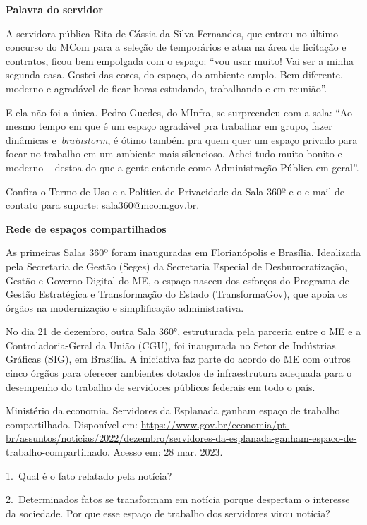 \begin{itemize}
\textbf{Palavra do servidor}

A servidora pública Rita de Cássia da Silva Fernandes, que entrou no
último concurso do MCom para a seleção de temporários e atua na área de
licitação e contratos, ficou bem empolgada com o espaço: ``vou usar
muito! Vai ser a minha segunda casa. Gostei das cores, do espaço, do
ambiente amplo. Bem diferente, moderno e agradável de ficar horas
estudando, trabalhando e em reunião''.

E ela não foi a única. Pedro Guedes, do MInfra, se surpreendeu com a
sala: ``Ao mesmo tempo em que é um espaço agradável pra trabalhar em
grupo, fazer dinâmicas e~\emph{brainstorm}, é ótimo também pra quem quer
um espaço privado para focar no trabalho em um ambiente mais silencioso.
Achei tudo muito bonito e moderno -- destoa do que a gente entende como
Administração Pública em geral''.

Confira o Termo de Uso e a Política de Privacidade da Sala 360º e o e-mail de contato
para
suporte: sala360@mcom.gov.br.

\textbf{Rede de espaços compartilhados}

As primeiras Salas 360º foram inauguradas em Florianópolis e Brasília.
Idealizada pela Secretaria de Gestão (Seges) da Secretaria Especial de
Desburocratização, Gestão e Governo Digital do ME, o espaço nasceu dos
esforços do Programa de Gestão Estratégica e Transformação do Estado
(TransformaGov), que apoia os órgãos na modernização e simplificação
administrativa.

No dia 21 de dezembro, outra Sala 360°, estruturada pela parceria entre
o ME e a Controladoria-Geral da União (CGU), foi inaugurada no Setor de
Indústrias Gráficas (SIG), em Brasília. A iniciativa faz parte do acordo
do ME com outros cinco órgãos para oferecer ambientes dotados de
infraestrutura adequada para o desempenho do trabalho de servidores
públicos federais em todo o país.

Ministério da economia. Servidores da Esplanada ganham espaço de
trabalho compartilhado. Disponível em:
\url{https://www.gov.br/economia/pt-br/assuntos/noticias/2022/dezembro/servidores-da-esplanada-ganham-espaco-de-trabalho-compartilhado}.
Acesso em: 28 mar. 2023.

1.~Qual é o fato relatado pela notícia?



2.~Determinados fatos se transformam em notícia porque despertam o
interesse da sociedade. Por que esse espaço de trabalho dos servidores
virou notícia?


\end{itemize}

